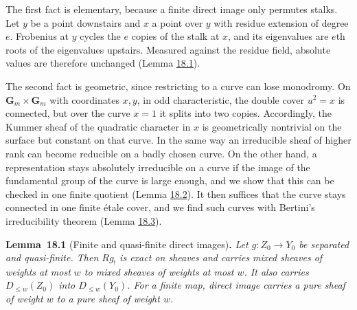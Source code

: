 \documentclass[11pt]{article}
\newenvironment{bpstatement}[2]{\par\addvspace{0.6\baselineskip}\noindent\textbf{#1}#2\textbf{.}\enspace\ignorespaces}
  {\par\addvspace{0.4\baselineskip}}
\newenvironment{bpstatementit}[2]{\begin{bpstatement}{#1}{#2}\itshape\ignorespaces}{\end{bpstatement}}
\begin{document}
The first fact is elementary, because a finite direct image only permutes stalks. Let \(y\) be a point downstairs and \(x\) a point over \(y\) with residue extension of degree \(e\). Frobenius at \(y\) cycles the \(e\) copies of the stalk at \(x\), and its eigenvalues are \(e\)th roots of the eigenvalues upstairs. Measured against the residue field, absolute values are therefore unchanged (Lemma \hyperref[bp275]{18.1}).

The second fact is geometric, since restricting to a curve can lose monodromy. On \(\mathbf G_m\times\mathbf G_m\) with coordinates \(x,y\), in odd characteristic, the double cover \(u^2=x\) is connected, but over the curve \(x=1\) it splits into two copies. Accordingly, the Kummer sheaf of the quadratic character in \(x\) is geometrically nontrivial on the surface but constant on that curve. In the same way an irreducible sheaf of higher rank can become reducible on a badly chosen curve. On the other hand, a representation stays absolutely irreducible on a curve if the image of the fundamental group of the curve is large enough, and we show that this can be checked in one finite quotient (Lemma \hyperref[bp278]{18.2}). It then suffices that the curve stays connected in one finite étale cover, and we find such curves with Bertini's irreducibility theorem (Lemma \hyperref[bp281]{18.3}).

\label{bp275}%
\begin{bpstatementit}{Lemma~18.1}{ (Finite and quasi-finite direct images)}
Let \(g:Z_0\to Y_0\) be separated and quasi-finite. Then \(Rg_!\) is exact on sheaves and carries mixed sheaves of weights at most \(w\) to mixed sheaves of weights at most \(w\). It also carries \(D_{\leq w}(Z_0)\) into \(D_{\leq w}(Y_0)\). For a finite map, direct image carries a pure sheaf of weight \(w\) to a pure sheaf of weight \(w\).
\end{bpstatementit}
\end{document}
